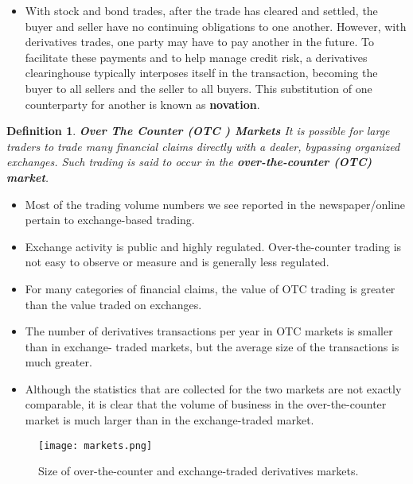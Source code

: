 \documentclass[letterpaper,10pt]{article}
\newtheorem{df}{Definition}[section]
\begin{document}
\begin{itemize}
\item With stock and bond trades, after the trade has cleared and settled, the buyer and seller have no continuing obligations to one another. However, with derivatives trades, one party may have to pay another in the future. To facilitate these payments and to help manage credit risk, a derivatives clearinghouse typically interposes itself in the transaction, becoming the buyer to all sellers and the seller to all buyers. This substitution of one counterparty for another is known as {\bf novation}.


\end{itemize}

\begin{df}{\bf Over The Counter (OTC ) Markets}
It is possible for large traders to trade many financial claims directly with a dealer, bypassing organized exchanges. Such trading is said to occur in the {\bf over-the-counter (OTC) market}.
\end{df}

\begin{itemize}

\item Most of the trading volume numbers we see reported in the newspaper/online pertain to exchange-based trading. 

\item Exchange activity is public and highly regulated. Over-the-counter trading is not easy to observe or measure and is generally less regulated. 

\item For many categories of financial claims, the value of OTC trading is greater than the value traded on exchanges.

\item The number of derivatives transactions per year in OTC markets is smaller than in exchange- traded markets, but the average size of the transactions is much greater. 

\item Although the statistics that are collected for the two markets are not exactly comparable, it is clear that the volume of business in the over-the-counter market is much larger than in the exchange-traded market. 

\end{itemize}


\begin{figure}[ht]
\begin{center}
\texttt{[image: markets.png]}
\caption{Size of over-the-counter and exchange-traded derivatives markets.}
\end{center}
\end{figure}
\end{document}

